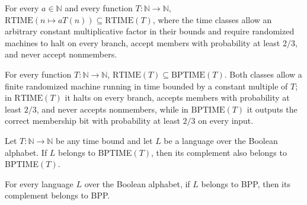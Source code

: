 \begin{theorem}
\label{Randomized.RTIME_const_mul_subset}
\leanok
{}
For every $a \in \mathbb{N}$ and every function $T : \mathbb{N} \to \mathbb{N}$,
$\mathrm{RTIME}(n \mapsto aT(n)) \subseteq \mathrm{RTIME}(T)$, where the time classes
allow an arbitrary constant multiplicative factor in their bounds and require randomized
machines to halt on every branch, accept members with probability at least $2/3$, and
never accept nonmembers.
\end{theorem}

\begin{theorem}
\label{Randomized.RTIME_subset_BPTIME}
\leanok
{}
For every function $T : \mathbb{N} \to \mathbb{N}$, $\mathrm{RTIME}(T) \subseteq
\mathrm{BPTIME}(T)$. Both classes allow a finite randomized machine running in time
bounded by a constant multiple of $T$; in $\mathrm{RTIME}(T)$ it halts on every branch,
accepts members with probability at least $2/3$, and never accepts nonmembers, while in
$\mathrm{BPTIME}(T)$ it outputs the correct membership bit with probability at least
$2/3$ on every input.
\end{theorem}

\begin{theorem}
\label{Randomized.compl_mem_BPTIME}
\leanok
{}
Let $T:\mathbb{N}\to\mathbb{N}$ be any time bound and let $L$ be a language over the
Boolean alphabet. If $L$ belongs to BPTIME$(T)$, then its complement also belongs to
BPTIME$(T)$.
\end{theorem}

\begin{theorem}
\label{Randomized.compl_mem_BPP_PTM}
\leanok
{}
For every language $L$ over the Boolean alphabet, if $L$ belongs to BPP, then its
complement belongs to BPP.
\end{theorem}
